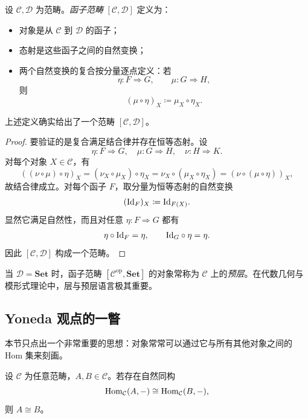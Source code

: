 \begin{definition}
设 $\mathcal C,\mathcal D$ 为范畴。\emph{函子范畴} $[\mathcal C,\mathcal D]$ 定义为：
\begin{itemize}[leftmargin=2em]
  \item 对象是从 $\mathcal C$ 到 $\mathcal D$ 的函子；
  \item 态射是这些函子之间的自然变换；
  \item 两个自然变换的复合按分量逐点定义：若
  \[
    \eta\colon F\Rightarrow G,
    \qquad
    \mu\colon G\Rightarrow H,
  \]
  则
  \[
    (\mu\circ \eta)_X \coloneqq \mu_X\circ \eta_X.
  \]
\end{itemize}
\end{definition}

\begin{proposition}
上述定义确实给出了一个范畴 $[\mathcal C,\mathcal D]$。
\end{proposition}

\begin{proof}
要验证的是复合满足结合律并存在恒等态射。设
\[
  \eta\colon F\Rightarrow G,
  \quad
  \mu\colon G\Rightarrow H,
  \quad
  \nu\colon H\Rightarrow K.
\]
对每个对象 $X\in \mathcal C$，有
\[
  ((\nu\circ \mu)\circ \eta)_X
  = (\nu_X\circ \mu_X)\circ \eta_X
  = \nu_X\circ (\mu_X\circ \eta_X)
  = (\nu\circ (\mu\circ \eta))_X,
\]
故结合律成立。对每个函子 $F$，取分量为恒等态射的自然变换
\[
  (\mathrm{Id}_F)_X\coloneqq \mathrm{Id}_{F(X)}.
\]
显然它满足自然性，而且对任意 $\eta\colon F\Rightarrow G$ 都有
\[
  \eta\circ \mathrm{Id}_F = \eta,
  \qquad
  \mathrm{Id}_G\circ \eta = \eta.
\]
因此 $[\mathcal C,\mathcal D]$ 构成一个范畴。
\end{proof}

\begin{remark}
当 $\mathcal D=\mathbf{Set}$ 时，函子范畴 $[\mathcal C^{\mathrm{op}},\mathbf{Set}]$ 的对象常称为 $\mathcal C$ 上的\emph{预层}。在代数几何与模形式理论中，层与预层语言极其重要。
\end{remark}

\subsection{Yoneda 观点的一瞥}

本节只点出一个非常重要的思想：对象常常可以通过它与所有其他对象之间的 Hom 集来刻画。

\begin{proposition}
设 $\mathcal C$ 为任意范畴，$A,B\in \mathcal C$。若存在自然同构
\[
  \mathrm{Hom}_{\mathcal C}(A,-)\cong \mathrm{Hom}_{\mathcal C}(B,-),
\]
则 $A\cong B$。
\end{proposition}

